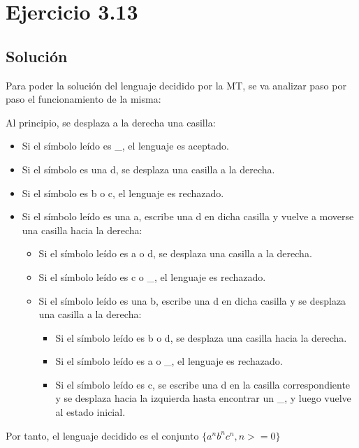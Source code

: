 \documentclass[11pt, a4paper, titlepage]{article}
\begin{document}
\section{Ejercicio 3.13}
\subsection*{Solución}

Para poder la solución del lenguaje decidido por la MT, se va analizar paso por
paso el funcionamiento de la misma:

Al principio, se desplaza a la derecha una casilla:
\begin{itemize}
\item Si el símbolo leído es \_, el lenguaje es aceptado.
\item Si el símbolo es una d, se desplaza una casilla a la derecha.
\item Si el símbolo es b o c, el lenguaje es rechazado.
\item Si el símbolo leído es una a, escribe una d en dicha casilla
  y vuelve a moverse una casilla hacia la derecha:
  \begin{itemize}
  \item Si el símbolo leído es a o d, se desplaza una casilla a la derecha.
  \item Si el símbolo leído es c o \_, el lenguaje es rechazado.
  \item Si el símbolo leído es una b, escribe una d en dicha casilla
    y se desplaza una casilla a la derecha:
    \begin{itemize}
    \item Si el símbolo leído es b o d, se desplaza una casilla hacia la derecha.
    \item Si el símbolo leído es a o \_, el lenguaje es rechazado.
    \item Si el símbolo leído es c, se escribe una d en la casilla correspondiente
      y se desplaza hacia la izquierda hasta encontrar un \_, y luego vuelve al
      estado inicial.
    \end{itemize}
  \end{itemize}
\end{itemize}
Por tanto, el lenguaje decidido es el conjunto $\{a^nb^nc^n , n>= 0\}$
\end{document}
